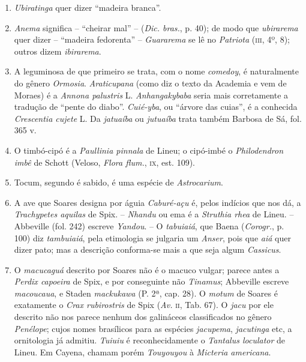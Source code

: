 \begin{enumerate}
\item \textit{Ubiratinga} quer dizer ``madeira branca''.

\item \textit{Anema} significa -- ``cheirar mal'' -- (\textit{Dic. bras.}, p. 40); de modo que \textit{ubirarema} quer 
dizer -- ``madeira fedorenta'' --  \textit{Guararema} se lê no \textit{Patriota}
(\textsc{iii}, 4º, 8); outros dizem \textit{ibirarema}.

\item A leguminosa de que primeiro se trata, com o nome \textit{comedoy}, é naturalmente do 
gênero \textit{Ormosia}. \textit{Araticupana} (como diz o texto da Academia e vem de Moraes) 
é a  \textit{Annona palustris} L. \textit{Anhangakybaba} seria mais corretamente a tradução de ``pente 
do diabo''. \textit{Cuié-yba}, ou ``árvore das cuias'', é a conhecida \textit{Crescentia cujete} L.
Da  \textit{jatuaíba} ou \textit{jutuaíba} trata também Barbosa de Sá, fol. 365 v.

\item O timbó-cipó é a \textit{Paullinia pinnala} de Lineu; o cipó-imbé o \textit{Philodendron imbê} 
de Schott (Veloso, \textit{Flora flum.}, \textsc{ix}, est. 109).

\item Tocum, segundo é sabido, é uma espécie de \textit{Astrocarium}.

\item A ave que Soares designa por águia \textit{Caburé-açu} é, pelos indícios que nos dá, 
a  \textit{Trachypetes aquilas} de Spix. -- \textit{Nhandu} ou ema é a \textit{Struthia rhea} de Lineu. -- 
Abbeville (fol. 242) escreve \textit{Yandou}. -- O \textit{tabuiaiá}, que Baena
(\textit{Corogr.}, p. 100) diz \textit{tambuiaiá}, pela etimologia se julgaria um \textit{Anser}, pois que \textit{aiá} quer dizer 
pato; mas a descrição conforma-se mais a que seja algum \textit{Cassicus}.

\item  O \textit{macucaguá} descrito por Soares não é o macuco vulgar; parece
antes a \textit{Perdix capoeira} de Spix, e por conseguinte não \textit{Tinamus}; Abbeville
escreve \textit{macoucaua}, e Staden \textit{mackukawa} (P. 2ª, cap. 28).
O \textit{motum} de Soares é exatamente o \textit{Crax rubirostris} de Spix (\textit{Av.} \textsc{ii}, Tab. 67). O \textit{jacu} 
por ele descrito não nos parece nenhum dos galináceos classificados no gênero \textit{Penélope}; 
cujos nomes brasílicos para as espécies \textit{jacupema}, \textit{jacutinga} etc, a ornitologia já admitiu.
\textit{Tuiuiu} é reconhecidamente o \textit{Tantalus loculator} de Lineu. Em Cayena, chamam porém  \textit{Touyouyou} à \textit{Micteria 
americana}.


\end{enumerate}
